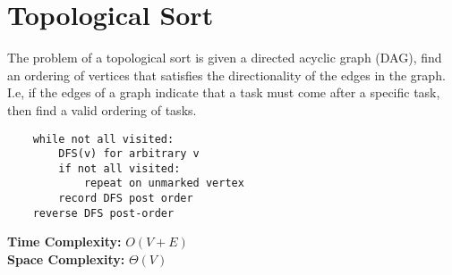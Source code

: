 \documentclass{article}
\begin{document}
\section{Topological Sort}
The problem of a topological sort is given a directed acyclic graph (DAG), find an ordering of vertices that satisfies the directionality of the edges in the graph.
I.e, if the edges of a graph indicate that a task must come after a specific task, then find a valid ordering of tasks.
\begin{lstlisting}
    while not all visited:
        DFS(v) for arbitrary v
        if not all visited:
            repeat on unmarked vertex
        record DFS post order
    reverse DFS post-order
\end{lstlisting}
\textbf{Time Complexity: } $O(V+E)$\\
\textbf{Space Complexity: } $\Theta(V)$
\end{document}
